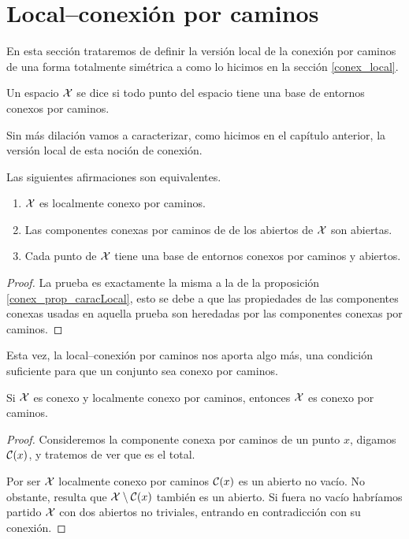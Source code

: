 \section{Local--conexión por caminos}
En esta sección trataremos de definir la versión local de la conexión por caminos de una forma totalmente simétrica a como lo hicimos en la sección \ref{conex_local}.
\begin{defi}
	Un espacio $\mathcal{X}$ se dice  si todo punto del espacio tiene una base de entornos conexos por caminos.
\end{defi}
Sin más dilación vamos a caracterizar, como hicimos en el capítulo anterior, la versión local de esta noción de conexión.
\begin{lem}[Caracterización]
	\label{cam_lem_caracter}
	Las siguientes afirmaciones son equivalentes.
	\begin{enumerate}
		\item $\mathcal{X}$ es localmente conexo por caminos.
		\item Las componentes conexas por caminos de de los abiertos de $\mathcal{X}$ son abiertas.
		\item Cada punto de $\mathcal{X}$ tiene una base de entornos conexos por caminos y abiertos.
	\end{enumerate}
\end{lem}
\begin{proof}
	La prueba es exactamente la misma a la de la proposición \ref{conex_prop_caracLocal}, esto se debe a que las propiedades de las componentes conexas usadas en aquella prueba son heredadas por las componentes conexas por caminos.
\end{proof}
Esta vez, la local--conexión por caminos nos aporta algo más, una condición suficiente para que un conjunto sea conexo por caminos.
\begin{prop}
	\label{cam_prop_condSuf}
	Si $\mathcal{X}$ es conexo y localmente conexo por caminos, entonces $\mathcal{X}$ es conexo por caminos.
\end{prop}
\begin{proof}
	Consideremos la componente conexa por caminos de un punto $x$, digamos $\mathcal{C}(x)$, y tratemos de ver que es el total.
	
	Por ser $\mathcal{X}$ localmente conexo por caminos $\mathcal{C}(x)$ es un abierto no vacío. No obstante, resulta que $\mathcal{X}\setminus \mathcal{C}(x)$ también es un abierto. Si fuera no vacío habríamos partido $\mathcal{X}$ con dos abiertos no triviales, entrando en contradicción con su conexión. 
\end{proof}
